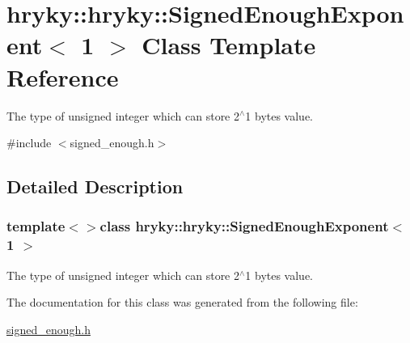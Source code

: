 \hypertarget{classhryky_1_1hryky_1_1_signed_enough_exponent_3_011_01_4}{\section{hryky\-:\-:hryky\-:\-:Signed\-Enough\-Exponent$<$ 1 $>$ Class Template Reference}
\label{classhryky_1_1hryky_1_1_signed_enough_exponent_3_011_01_4}
}


The type of unsigned integer which can store 2$^\wedge$1 bytes value.  




{\ttfamily \#include $<$signed\-\_\-enough.\-h$>$}



\subsection{Detailed Description}
\subsubsection*{template$<$$>$class hryky\-::hryky\-::\-Signed\-Enough\-Exponent$<$ 1 $>$}

The type of unsigned integer which can store 2$^\wedge$1 bytes value. 

The documentation for this class was generated from the following file\-:\begin{DoxyCompactItemize}
\item 
\hyperlink{signed__enough_8h}{signed\-\_\-enough.\-h}\end{DoxyCompactItemize}
